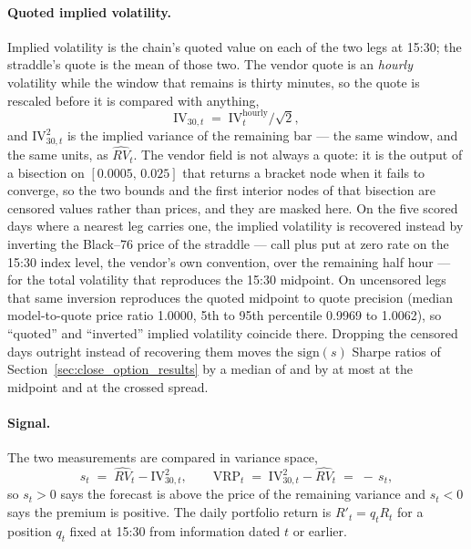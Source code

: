 \paragraph{Quoted implied volatility.} Implied volatility is the
chain's quoted value on each of the two legs at 15:30; the straddle's
quote is the mean of those two. The vendor quote is an \emph{hourly}
volatility while the window that remains is thirty minutes, so the
quote is rescaled before it is compared with anything,
\begin{equation}
    \mathrm{IV}_{30,t}
    \;=\;
    \mathrm{IV}^{\mathrm{hourly}}_t \big/ \sqrt{2},
    \label{eq:close_opt_ivscale}
\end{equation}
and $\mathrm{IV}_{30,t}^{2}$ is the implied variance of the remaining
bar --- the same window, and the same units, as $\widehat{RV}_t$. The
vendor field is not always a quote: it is the output of a bisection on
$[0.0005,\,0.025]$ that returns a bracket node when it fails to converge, so
the two bounds and the first interior nodes of that bisection are censored
values rather than prices, and they are masked here. On the five scored
days where a nearest leg carries one, the implied volatility is recovered
instead by inverting the Black--76 price of the straddle --- call plus put at
zero rate on the 15:30 index level, the vendor's own convention, over the
remaining half hour --- for the total volatility that reproduces the 15:30
midpoint. On uncensored legs that same inversion
reproduces the quoted midpoint to quote precision (median model-to-quote
price ratio 1.0000, 5th to 95th percentile 0.9969 to
1.0062), so ``quoted'' and ``inverted'' implied volatility coincide
there.
Dropping the \cmCensIvDays{} censored days outright instead of recovering them moves the %
$\mathrm{sign}(s)$ Sharpe ratios of Section~\ref{sec:close_option_results} by a median of
\cmCensIvMedDSh{} and by at most \cmCensIvMaxDSh{} at the midpoint and \cmCensIvMaxDShX{} at
the crossed spread.

\paragraph{Signal.} The two measurements are compared in variance
space,
\begin{equation}
    s_t \;=\; \widehat{RV}_t - \mathrm{IV}_{30,t}^{2},
    \qquad
    \mathrm{VRP}_t \;=\; \mathrm{IV}_{30,t}^{2} - \widehat{RV}_t
    \;=\; -\,s_t,
    \label{eq:close_opt_signal}
\end{equation}
so $s_t>0$ says the forecast is above the price of the remaining
variance and $s_t<0$ says the premium is positive. The daily portfolio
return is $R'_t = q_t R_t$ for a position $q_t$ fixed at 15:30 from
information dated $t$ or earlier.

